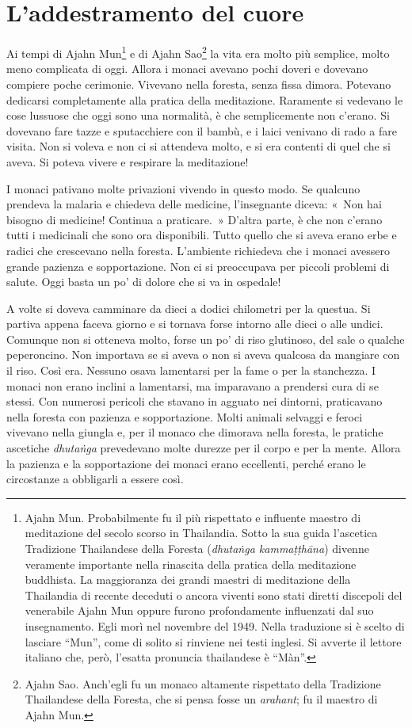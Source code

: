 \chapter{L'addestramento del cuore}

Ai tempi di Ajahn Mun\footnote{Ajahn Mun. Probabilmente fu il più
  rispettato e influente maestro di meditazione del secolo scorso in
  Thailandia. Sotto la sua guida l'ascetica Tradizione Thailandese della
  Foresta (\emph{dhutaṅga kammaṭṭhāna}) divenne veramente importante
  nella rinascita della pratica della meditazione buddhista. La
  maggioranza dei grandi maestri di meditazione della Thailandia di
  recente deceduti o ancora viventi sono stati diretti discepoli del
  venerabile Ajahn Mun oppure furono profondamente influenzati dal suo
  insegnamento. Egli morì nel novembre del 1949. Nella traduzione si è
  scelto di lasciare ``Mun'', come di solito si rinviene nei testi
  inglesi. Si avverte il lettore italiano che, però, l'esatta pronuncia
  thailandese è ``Màn''.} e di Ajahn Sao\footnote{Ajahn Sao. Anch'egli
  fu un monaco altamente rispettato della Tradizione Thailandese della
  Foresta, che si pensa fosse un \emph{arahant}; fu il maestro di Ajahn
  Mun.} la vita era molto più semplice, molto meno complicata di oggi.
Allora i monaci avevano pochi doveri e dovevano compiere poche
cerimonie. Vivevano nella foresta, senza fissa dimora. Potevano
dedicarsi completamente alla pratica della meditazione. Raramente si
vedevano le cose lussuose che oggi sono una normalità, è che
semplicemente non c'erano. Si dovevano fare tazze e sputacchiere con il
bambù, e i laici venivano di rado a fare visita. Non si voleva e non ci
si attendeva molto, e si era contenti di quel che si aveva. Si poteva
vivere e respirare la meditazione!

I monaci pativano molte privazioni vivendo in questo modo. Se qualcuno
prendeva la malaria e chiedeva delle medicine, l'insegnante diceva:
«~Non hai bisogno di medicine! Continua a praticare.~» D'altra parte, è
che non c'erano tutti i medicinali che sono ora disponibili. Tutto
quello che si aveva erano erbe e radici che crescevano nella foresta.
L'ambiente richiedeva che i monaci avessero grande pazienza e
sopportazione. Non ci si preoccupava per piccoli problemi di salute.
Oggi basta un po' di dolore che si va in ospedale!

A volte si doveva camminare da dieci a dodici chilometri per la questua.
Si partiva appena faceva giorno e si tornava forse intorno alle dieci o
alle undici. Comunque non si otteneva molto, forse un po' di riso
glutinoso, del sale o qualche peperoncino. Non importava se si aveva o
non si aveva qualcosa da mangiare con il riso. Così era. Nessuno osava
lamentarsi per la fame o per la stanchezza. I monaci non erano inclini a
lamentarsi, ma imparavano a prendersi cura di se stessi. Con numerosi
pericoli che stavano in agguato nei dintorni, praticavano nella foresta
con pazienza e sopportazione. Molti animali selvaggi e feroci vivevano
nella giungla e, per il monaco che dimorava nella foresta, le pratiche
ascetiche \emph{dhutaṅga} prevedevano molte durezze per il corpo e per
la mente. Allora la pazienza e la sopportazione dei monaci erano
eccellenti, perché erano le circostanze a obbligarli a essere così.

